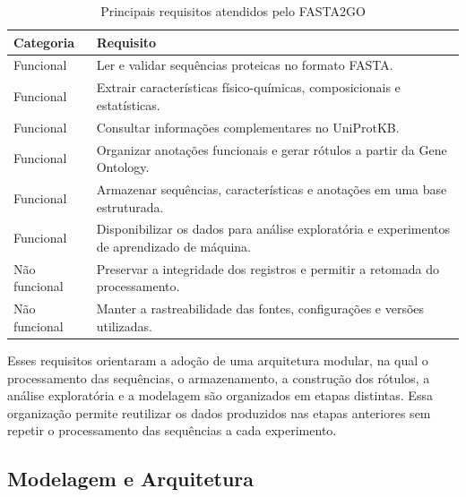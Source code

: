 \begin{table}[htb]
    \centering
    \ABNTEXfontereduzida
    \caption{Principais requisitos atendidos pelo FASTA2GO}
    \label{tab:requisitos-fasta2go}
    \begin{tabular}{p{} p{}}
        \toprule
        \textbf{Categoria} & \textbf{Requisito} \\
        \midrule
        Funcional & Ler e validar sequências proteicas no formato FASTA. \\
        Funcional & Extrair características físico-químicas, composicionais e estatísticas. \\
        Funcional & Consultar informações complementares no UniProtKB. \\
        Funcional & Organizar anotações funcionais e gerar rótulos a partir da Gene Ontology. \\
        Funcional & Armazenar sequências, características e anotações em uma base estruturada. \\
        Funcional & Disponibilizar os dados para análise exploratória e experimentos de aprendizado de máquina. \\
        Não funcional & Preservar a integridade dos registros e permitir a retomada do processamento. \\
        Não funcional & Manter a rastreabilidade das fontes, configurações e versões utilizadas. \\
        \bottomrule
    \end{tabular}
\end{table}

Esses requisitos orientaram a adoção de uma arquitetura modular, na qual o processamento das sequências, o armazenamento, a construção dos rótulos, a análise exploratória e a modelagem são organizados em etapas distintas. Essa organização permite reutilizar os dados produzidos nas etapas anteriores sem repetir o processamento das sequências a cada experimento.



\subsection{Modelagem e Arquitetura}
\label{sec:modelagem-e-arquitetura}

